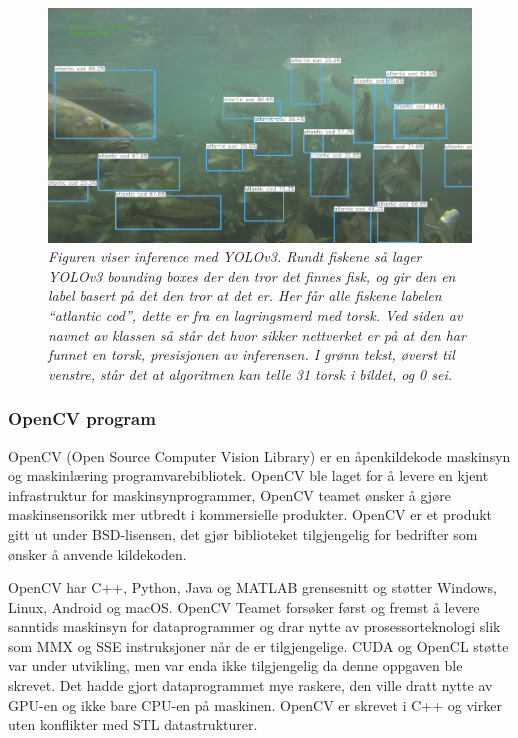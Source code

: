 \begin{figure}
\begin{center} 
\includegraphics[scale=0.35]{figures/inference_yolo}
\caption{\small \sl Figuren viser inference med YOLOv3. Rundt fiskene så lager YOLOv3 bounding boxes der den tror det finnes fisk, og gir den en label basert på det den tror at det er. Her får alle fiskene labelen ``atlantic cod'', dette er fra en lagringsmerd med torsk. Ved siden av navnet av klassen så står det hvor sikker nettverket er på at den har funnet en torsk, presisjonen av inferensen. I grønn tekst, øverst til venstre, står det at algoritmen kan telle 31 torsk i bildet, og 0 sei. \label{fig:yolo_inference}} 
\end{center} 
\end{figure} 

\subsubsection{OpenCV program}

OpenCV (Open Source Computer Vision Library) er en åpenkildekode maskinsyn og maskinlæring programvarebibliotek. OpenCV ble laget for å levere en kjent infrastruktur for maskinsynprogrammer, OpenCV teamet ønsker å gjøre maskinsensorikk mer utbredt i kommersielle produkter. OpenCV er et produkt gitt ut under BSD-lisensen, det gjør biblioteket tilgjengelig for bedrifter som ønsker å anvende kildekoden. \cite{OpenCV Team 2020}

OpenCV har C++, Python, Java og MATLAB grensesnitt og støtter Windows, Linux, Android og macOS. OpenCV Teamet forsøker først og fremst å levere sanntids maskinsyn for dataprogrammer og drar nytte av prosessorteknologi slik som MMX og SSE instruksjoner når de er tilgjengelige. CUDA og OpenCL støtte var under utvikling, men var enda ikke tilgjengelig da denne oppgaven ble skrevet. Det hadde gjort dataprogrammet mye raskere, den ville dratt nytte av GPU-en og ikke bare CPU-en på maskinen. OpenCV er skrevet i C++ og virker uten konflikter med STL datastrukturer. \cite{OpenCV Team 2020}

